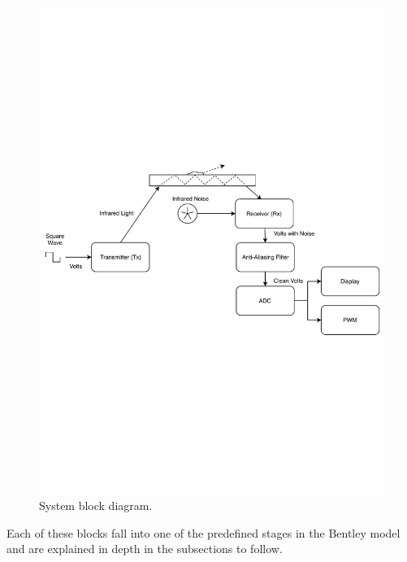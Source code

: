 \documentclass[conference, 11pt]{IEEEtran}
\begin{document}
 \begin{figure}[H]
 \centering 
 \includegraphics[width=\columnwidth]{SystemBlockDiagram}
 \centering 
  \caption {System block diagram. }
 \end{figure}
 
 Each of these blocks fall into one of the predefined stages in the Bentley model and are explained in depth in the subsections to follow.
 
\end{document}
